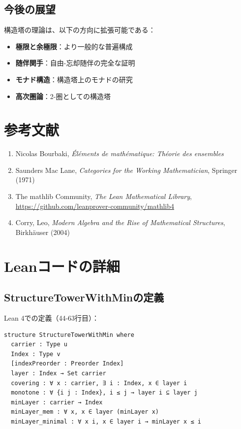 \documentclass[a4paper,12pt]{ltjsarticle}
\theoremstyle{definition}
\begin{document}
\subsection{今後の展望}

構造塔の理論は、以下の方向に拡張可能である：

\begin{itemize}
\item \textbf{極限と余極限}：より一般的な普遍構成
\item \textbf{随伴関手}：自由-忘却随伴の完全な証明
\item \textbf{モナド構造}：構造塔上のモナドの研究
\item \textbf{高次圏論}：2-圏としての構造塔
\end{itemize}

\section*{参考文献}

\begin{enumerate}
\item Nicolas Bourbaki, \textit{Éléments de mathématique: Théorie des ensembles}
\item Saunders Mac Lane, \textit{Categories for the Working Mathematician}, Springer (1971)
\item The mathlib Community, \textit{The Lean Mathematical Library}, \url{https://github.com/leanprover-community/mathlib4}
\item Corry, Leo, \textit{Modern Algebra and the Rise of Mathematical Structures}, Birkhäuser (2004)
\end{enumerate}

\appendix

\section{Leanコードの詳細}

\subsection{StructureTowerWithMinの定義}

Lean 4での定義（44-63行目）：
\begin{verbatim}
structure StructureTowerWithMin where
  carrier : Type u
  Index : Type v
  [indexPreorder : Preorder Index]
  layer : Index → Set carrier
  covering : ∀ x : carrier, ∃ i : Index, x ∈ layer i
  monotone : ∀ {i j : Index}, i ≤ j → layer i ⊆ layer j
  minLayer : carrier → Index
  minLayer_mem : ∀ x, x ∈ layer (minLayer x)
  minLayer_minimal : ∀ x i, x ∈ layer i → minLayer x ≤ i
\end{verbatim}
\end{document}
